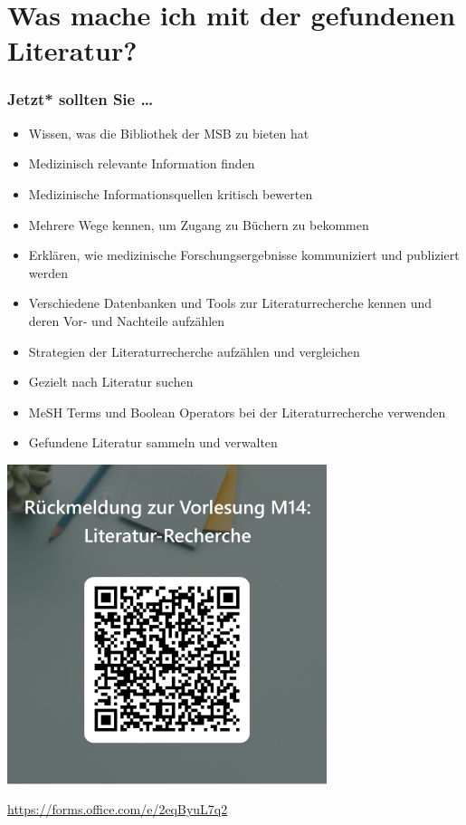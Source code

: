 \documentclass{beamer}
\begin{document}


\section{Was mache ich mit der gefundenen Literatur?}






\begin{frame}

\frametitle{Jetzt* sollten Sie \dots}


\begin{itemize}
\item
Wissen, was die Bibliothek der MSB zu bieten hat
\item 
Medizinisch relevante Information finden
\item 
Medizinische Informationsquellen kritisch bewerten
\item 
Mehrere Wege kennen, um Zugang zu Büchern zu bekommen
\item 
Erklären, wie medizinische Forschungsergebnisse kommuniziert und publiziert werden
\item 
Verschiedene Datenbanken und Tools zur Literaturrecherche kennen und deren Vor- und Nachteile aufzählen
\item 
Strategien der Literaturrecherche aufzählen und vergleichen
\item 
Gezielt nach Literatur suchen
\item 
MeSH Terms und Boolean Operators bei der Literaturrecherche verwenden
\item 
Gefundene Literatur sammeln und verwalten
\end{itemize}

\end{frame}


\begin{frame}

\begin{center}
    \includegraphics[width=0.7\textwidth]{feedback_QR.png}
\end{center}


\url{https://forms.office.com/e/2eqByuL7q2}

\end{frame}
\end{document}
